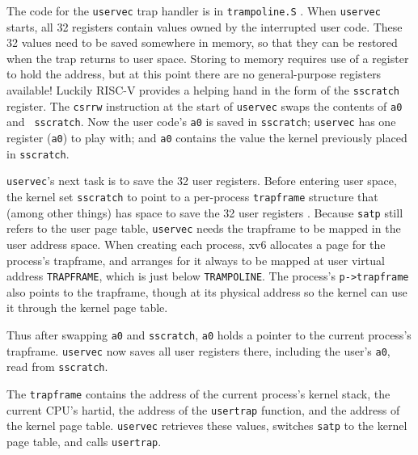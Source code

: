 The code for the {\tt uservec} trap handler is in {\tt trampoline.S}
.
When {\tt uservec} starts, all 32 registers contain values owned by
the interrupted user code. These 32 values need to be saved somewhere
in memory, so that
they can be restored when the trap returns to user space.
Storing to memory requires use of a register
to hold the address,
but at this point there are no general-purpose registers available!
Luckily RISC-V provides a helping hand in the
form of the {\tt sscratch} register. The {\tt csrrw} instruction at
the start of {\tt uservec} swaps the contents of {\tt a0} and {\tt
  sscratch}. Now the user code's {\tt a0} is saved
in {\tt sscratch}; {\tt uservec} has
one register ({\tt a0}) to play with; and {\tt a0} contains the
value the kernel previously placed in {\tt sscratch}.

{\tt uservec}'s next task is to save the 32 user registers. Before
entering user space, the kernel set {\tt sscratch} to point to a
per-process {\tt trapframe} structure that (among other things) has space to
save the 32 user registers
. Because {\tt satp} still
refers to the user page table, {\tt uservec} needs the trapframe to be
mapped in the user address space. When creating each process, xv6
allocates a page for the process's trapframe, and arranges for it
always to be mapped at user virtual address {\tt TRAPFRAME}, which is
just below {\tt TRAMPOLINE}. The process's {\tt p->trapframe} also
points to the
trapframe, though at its physical address so the kernel can use it
through the kernel page table.

Thus after swapping {\tt a0} and {\tt sscratch}, {\tt a0}
holds a pointer to the current process's trapframe.
{\tt uservec} now saves all user registers there,
including the user's {\tt a0}, read from {\tt sscratch}.

The {\tt trapframe} contains the address of the current process's
kernel stack, the current CPU's hartid, the address of the {\tt usertrap}
function,
and the address of the kernel page table. {\tt uservec}
retrieves these values, switches {\tt satp} to the kernel page table,
and calls {\tt usertrap}.

